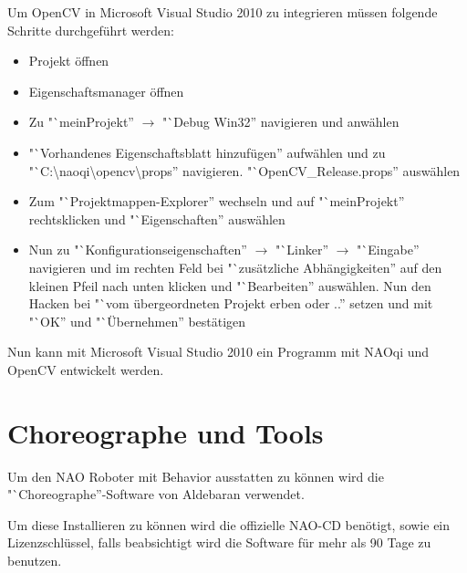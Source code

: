             Um OpenCV in Microsoft Visual Studio 2010 zu integrieren müssen
            folgende Schritte durchgeführt werden:

            \begin{itemize}
                \item Projekt öffnen
                \item Eigenschaftsmanager öffnen
                \item Zu "`meinProjekt'' $\rightarrow$ "`Debug Win32''
                    navigieren und anwählen
                \item "`Vorhandenes Eigenschaftsblatt hinzufügen'' aufwählen und
                    zu
                    "`C:\textbackslash{}naoqi\textbackslash{}opencv\textbackslash{}props''
                    navigieren. "`OpenCV\_Release.props'' auswählen

                \item Zum "`Projektmappen-Explorer'' wechseln und auf
                    "`meinProjekt'' rechtsklicken und "`Eigenschaften''
                    auswählen

                \item Nun zu "`Konfigurationseigenschaften'' $\rightarrow$ "`Linker'' $\rightarrow$
                    "`Eingabe'' navigieren und im rechten Feld bei "`zusätzliche
                    Abhängigkeiten'' auf den kleinen Pfeil nach unten klicken und
                    "`Bearbeiten'' auswählen. Nun den Hacken bei "`vom
                    übergeordneten Projekt erben oder ..'' setzen und mit "`OK''
                    und "`Übernehmen'' bestätigen
            \end{itemize}

            Nun kann mit Microsoft Visual Studio 2010 ein Programm mit NAOqi und
            OpenCV entwickelt werden.

    \section{Choreographe und Tools}
        \label{chap:inst:choero}

        Um den NAO Roboter mit Behavior ausstatten zu können wird die
        "`Choreographe''-Software von Aldebaran verwendet.

        Um diese Installieren zu können wird die offizielle NAO-\ac{CD}
        benötigt, sowie ein Lizenzschlüssel, falls beabsichtigt wird die
        Software für mehr als 90 Tage zu benutzen.

